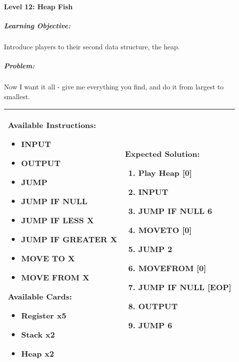\paragraph{Level 12: Heap Fish}
\subparagraph{Learning Objective:} Introduce players to their second data structure, the heap.

\subparagraph{Problem:} Now I want it all - give me everything you find, and do it from largest to smallest.

\begin{center}
    \begin{tabular}{ | m{5cm} | m{9cm} | } 
        \hline
            \textbf{Available Instructions:} 
            \begin{itemize}
                \setlength\itemsep{-.35em}
                \item INPUT
                \item OUTPUT
                \item JUMP
                \item JUMP IF NULL
                \item JUMP IF LESS X
                \item JUMP IF GREATER X
                \item MOVE TO X
                \item MOVE FROM X
            \end{itemize}
            \textbf{Available Cards:} 
            \begin{itemize}
                \setlength\itemsep{-.35em}
                \item Register x5
                \item Stack x2
                \item Heap x2
            \end{itemize}& 
            \textbf{Expected Solution:} 
            \begin{enumerate}
                \setlength\itemsep{-.35em}
                \item Play Heap [0]
                \item INPUT
                \item JUMP IF NULL 6
                \item MOVETO [0]
                \item JUMP 2
                \item MOVEFROM [0]
                \item JUMP IF NULL [EOP]
                \item OUTPUT
		\item JUMP 6
            \end{enumerate}
            \\
        \hline
    \end{tabular}
\end{center}


